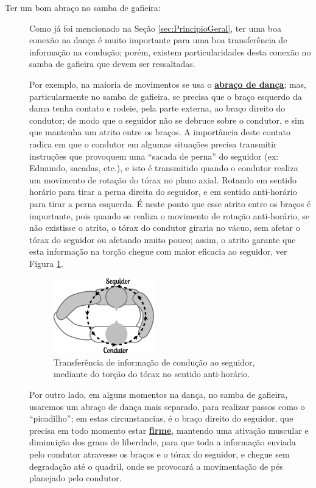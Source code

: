 \begin{description}
\item[Ter um bom abraço no samba de gafieira:] Como já foi mencionado na Seção \ref{sec:PrincipioGeral}, 
ter uma boa conexão na dança é muito importante para uma boa transferência de informação na condução; 
porém, existem particularidades desta conexão no samba de gafieira que devem ser ressaltadas.

Por exemplo, na maioria de movimentos se usa o \hyperref[def:abracodedanca]{\textbf{abraço de dança}};
mas, particularmente no samba de gafieira, se precisa que o braço esquerdo da dama tenha contato
e rodeie, pela parte externa, ao braço direito do condutor; 
de modo  que o seguidor não se debruce sobre o condutor,
e sim que mantenha um atrito entre os braços.
A importância deste contato radica em que o condutor em algumas situações precisa transmitir instruções 
que provoquem uma ``sacada de perna'' do seguidor (ex: Edmundo, sacadas, etc.), 
e isto é transmitido quando o condutor realiza um movimento de rotação do tórax no plano axial.  
Rotando em sentido horário para tirar a perna direita do seguidor, 
e em sentido anti-horário para tirar a perna esquerda.
É neste ponto que esse atrito entre os braços é importante, 
pois quando se realiza o movimento de rotação anti-horário, se não existisse o atrito,
o tórax do condutor giraria no vácuo, sem afetar o tórax do seguidor ou afetando muito pouco;
assim, o atrito garante que esta informação na torção chegue com maior eficacia ao seguidor,
ver Figura \ref{fig:torcao-abraco}.
\begin{figure}[h]
  \centering
    \includegraphics[width=0.43\textwidth]{chapters/cap-normas/torcao-abraco.eps}
\caption{Transferência de informação de condução ao seguidor, mediante do torção do tórax no sentido anti-horário.}
\label{fig:torcao-abraco}
\end{figure}

Por outro lado, em alguns momentos na dança, no samba de gafieira, usaremos um abraço de dança mais separado,
para realizar passos como o ``picadilho''; em estas circunstancias, é o braço direito do seguidor,
que precisa em todo momento estar \hyperref[def:brazosfirmes]{\textbf{firme}}, 
mantendo uma ativação muscular e diminuição dos graus de liberdade,
para que toda a informação enviada pelo condutor atravesse os braços e o tórax do seguidor,
e chegue sem degradação até o quadril, onde se provocará a movimentação de pés planejado pelo condutor.


\end{description}
